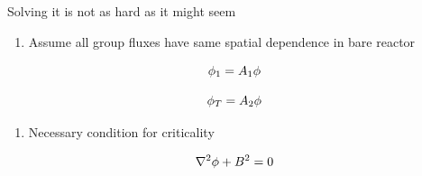 \documentclass[aspectratio=1610,pdftex,dvipsnames,compress,xcolor={dvipsnames}]{beamer}
\begin{document}
\begin{frame}{Solving it is not as hard as it might seem}
    \begin{enumerate}[series=outerlist,topsep=0pt,itemsep=11pt,leftmargin=*,label=(\arabic*)]
        \item[]Assume all group fluxes have same spatial dependence in bare reactor
    \end{enumerate}

    \vspace*{\fill}

    \begin{equation}
        \LARGE
        \phi_1 = A_1 \phi
    \end{equation}

    \begin{equation}
        \LARGE
        \phi_T = A_2 \phi
    \end{equation}

    \vspace*{\fill}

    \begin{enumerate}[series=outerlist,topsep=0pt,itemsep=11pt,leftmargin=*,label=(\arabic*)]
        \item[]Necessary condition for criticality
    \end{enumerate}

    \vspace*{\fill}

    \begin{equation}
        \LARGE
        \nabla^2 \phi + B^2 = 0
    \end{equation}
\end{frame}
\end{document}
